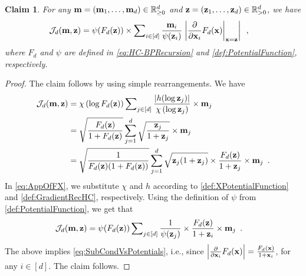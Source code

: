 \documentclass[11pt,reqno]{amsart}
\numberwithin{equation}{section}
\newtheorem{claim}[theorem]{Claim}
\newcommand{\cJ}{{\mathcal{J}}}
\newcommand{\blue}[1]{{\color{blue}#1}}
\newcommand{\cadmiumgreen}[1]{{\color{cadmiumgreen}#1}}
\newcommand{\heliotrope}[1]{{\color{heliotrope}#1}}
\newcommand{\dpotF}{{\psi}}
\newcommand{\xdpotF}{\chi}
\newcommand{\trecur}{F}
\newcommand{\dlogtrecur}{h}
\newcommand{\abs}[1]{\blue{|}#1\blue{|}}
\renewcommand{\blue}[1]{#1}
\renewcommand{\cadmiumgreen}[1]{#1}
\renewcommand{\heliotrope}[1]{#1}
\newcommand{\kx}{\heliotrope{x}}
\newcommand{\kz}{\cadmiumgreen{z}}
\renewcommand{\kx}{x}
\renewcommand{\kz}{z}
\begin{document}
\begin{claim}\label{claim:OnePotVsOtherPot}
For any ${\bf m}=({\bf m}_1, \ldots, {\bf m}_d)\in \mathbb{R}^{d}_{ \geq 0}$ and 
${\bf \kz}=({\bf \kz}_1, \ldots, {\bf \kz}_d)\in \mathbb{R}^{d}_{ > 0}$,
we have 
{
\begin{align}\label{eq:SubCondVsPotentials}
\cJ_{d}({\bf m}, {\bf \kz})&= 
\dpotF (\trecur_{d}({\bf \kz})) \times \sum\nolimits_{i\in [d]} \frac{{\bf m}_i }{\dpotF({\bf \kz}_i)} \left . 
\left| \frac{\partial }{\partial {\bf \kx}_i}\trecur_{d}({\bf \kx}) \right|_{{\bf \kx} ={\bf \kz}}\right| \enspace, 
\end{align}
}
where $\trecur_{d}$ and $\dpotF$ are defined
in \eqref{eq:HC-BPRecursion} and \eqref{def:PotentialFunction}, respectively. 
\end{claim}




\begin{proof}
The claim follows by using simple rearrangements. We have  
\begin{align}%
\cJ_{d}({\bf m}, {\bf \kz}) &= 
 \xdpotF\left(\log \trecur_{d}({\bf \kz}) \right) \sum\nolimits_{j\in [d]}
\frac{ \abs{ \dlogtrecur(\log {\bf \kz}_j )}}{ \xdpotF\left( \log {\bf \kz}_j \right)} 
\times {\bf m}_j \nonumber\\
&= \sqrt{\frac{\trecur_{d}({\bf \kz})}{1+\trecur_{d}(\bf \kz)}}
\sum^{d}_{j=1} \sqrt{\frac{{\bf \kz}_j}{1+{\bf \kz}_j}}\times {\bf m}_j \label{eq:AppOfFX}\\
&= \sqrt{\frac{1}{\trecur_{d}({\bf \kz})(1+\trecur_{d}(\bf \kz))}}
\sum^{d}_{j=1} \sqrt{{\bf \kz}_j(1+{\bf \kz}_j) }\times\frac{ \trecur_{d}(\bf \kz)}{1+{\bf \kz}_j} \times {\bf m}_j \enspace. \nonumber
\end{align}
In \eqref{eq:AppOfFX}, we substitute $\xdpotF$ and $\dlogtrecur$ according to 
\eqref{def:XPotentialFunction} and \eqref{def:GradientRecHC}, respectively.
Using the definition of $\dpotF $ from \eqref{def:PotentialFunction}, we get that 
\begin{align}
\cJ_{d}({\bf m}, {\bf \kz}) &= \dpotF(\trecur_{d}({\bf \kz})) 
\sum\nolimits_{j\in [d]}\frac{1}{ \dpotF({\bf \kz}_j)} \times \frac{ \trecur_{d}(\bf \kz)}{1+{\bf \kz}_i} \times {\bf m}_j \enspace. \nonumber
\end{align}
The above implies \eqref{eq:SubCondVsPotentials}, i.e.,  since 
$\left| \frac{\partial }{\partial {\bf \kx}_i}\trecur_{d}({\bf \kx}) \right|=\frac{\trecur_{d}({\bf \kx})}{1+{\bf \kx}_i}$, 
for any $i\in [d]$. 
%
The claim follows.
\end{proof}
\end{document}
